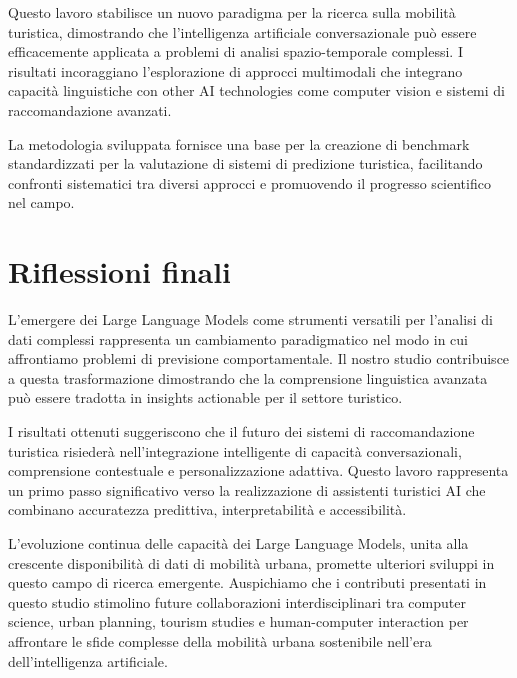 Questo lavoro stabilisce un nuovo paradigma per la ricerca sulla mobilità turistica, dimostrando che l'intelligenza artificiale conversazionale può essere efficacemente applicata a problemi di analisi spazio-temporale complessi. I risultati incoraggiano l'esplorazione di approcci multimodali che integrano capacità linguistiche con other AI technologies come computer vision e sistemi di raccomandazione avanzati.

La metodologia sviluppata fornisce una base per la creazione di benchmark standardizzati per la valutazione di sistemi di predizione turistica, facilitando confronti sistematici tra diversi approcci e promuovendo il progresso scientifico nel campo.

\section{Riflessioni finali}

L'emergere dei Large Language Models come strumenti versatili per l'analisi di dati complessi rappresenta un cambiamento paradigmatico nel modo in cui affrontiamo problemi di previsione comportamentale. Il nostro studio contribuisce a questa trasformazione dimostrando che la comprensione linguistica avanzata può essere tradotta in insights actionable per il settore turistico.

I risultati ottenuti suggeriscono che il futuro dei sistemi di raccomandazione turistica risiederà nell'integrazione intelligente di capacità conversazionali, comprensione contestuale e personalizzazione adattiva. Questo lavoro rappresenta un primo passo significativo verso la realizzazione di assistenti turistici AI che combinano accuratezza predittiva, interpretabilità e accessibilità.

L'evoluzione continua delle capacità dei Large Language Models, unita alla crescente disponibilità di dati di mobilità urbana, promette ulteriori sviluppi in questo campo di ricerca emergente. Auspichiamo che i contributi presentati in questo studio stimolino future collaborazioni interdisciplinari tra computer science, urban planning, tourism studies e human-computer interaction per affrontare le sfide complesse della mobilità urbana sostenibile nell'era dell'intelligenza artificiale.